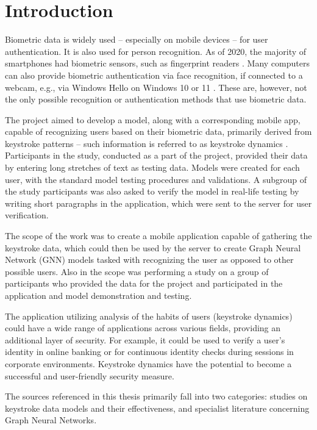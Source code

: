 
\chapter{Introduction}

Biometric data is widely used -- especially on mobile devices -- for user authentication. It is also used for person recognition. As of 2020, the majority of smartphones had biometric sensors, such as fingerprint readers \cite{statista_biometric_phones_2025}. Many computers can also provide biometric authentication via face recognition, if connected to a webcam, e.g., via Windows Hello on Windows 10 or 11 \cite{microsoft_windows_hello_2025}. These are, however, not the only possible recognition or authentication methods that use biometric data.

The project aimed to develop a model, along with a corresponding mobile app, capable of recognizing users based on their biometric data, primarily derived from keystroke patterns -- such information is referred to as keystroke dynamics \cite{wikipedia_keystrokes_2025}. Participants in the study, conducted as a part of the project, provided their data by entering long stretches of text as testing data. Models were created for each user, with the standard model testing procedures and validations. A subgroup of the study participants was also asked to verify the model in real-life testing by writing short paragraphs in the application, which were sent to the server for user verification.

The scope of the work was to create a mobile application capable of gathering the keystroke data, which could then be used by the server to create Graph Neural Network (GNN) models tasked with recognizing the user as opposed to other possible users. Also in the scope was performing a study on a group of participants who provided the data for the project and participated in the application and model demonstration and testing.

The application utilizing analysis of the habits of users (keystroke dynamics) could have a wide range of applications across various fields, providing an additional layer of security. For example, it could be used to verify a user's identity in online banking or for continuous identity checks during sessions in corporate environments. Keystroke dynamics have the potential to become a successful and user-friendly security measure.

The sources referenced in this thesis primarily fall into two categories: studies on keystroke data models and their effectiveness, and specialist literature concerning Graph Neural Networks.

